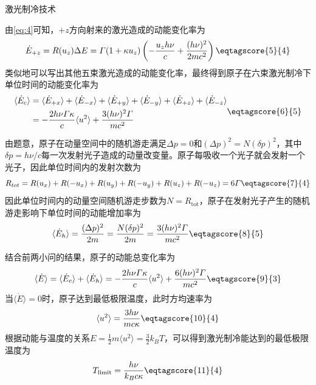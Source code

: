 \documentclass[answer]{cphos}
\begin{document}
\begin{problem}[40]{激光制冷技术}
\begin{solution}
由\ref{eq:4}可知，$+z$方向射来的激光造成的动能变化率为
\begin{equation}
    \dot{E}_{+z} = R(u_z) \Delta E = \varGamma(1+\kappa u_z) \left(-\frac{u_zh\nu}{c}+\frac{(h\nu)^2}{2mc^2}\right) \eqtagscore{5}{4}
\end{equation}
类似地可以写出其他五束激光造成的动能变化率，最终得到原子在六束激光制冷下单位时间的动能变化率为
\begin{equation}
    \begin{aligned}
    \langle \dot{E}_c \rangle &= \langle \dot{E}_{+x} \rangle + \langle \dot{E}_{-x} \rangle + \langle \dot{E}_{+y} \rangle + \langle \dot{E}_{-y} \rangle + \langle \dot{E}_{+z} \rangle + \langle \dot{E}_{-z} \rangle \\
    &= -\frac{2h\nu\varGamma\kappa}{c} \langle u^2 \rangle + \frac{3(h\nu)^2\varGamma}{mc^2}
    \end{aligned}
    \eqtagscore{6}{5}
\end{equation}

 由题意，原子在动量空间中的随机游走满足$\Delta p = 0$和$(\Delta p)^2 = N(\delta p)^2$，其中$\delta p = h\nu/c$每一次发射光子造成的动量改变量。原子每吸收一个光子就会发射一个光子，因此单位时间内的发射次数为
\begin{equation}
    R_{tot} = R(u_x) + R(-u_x) + R(u_y) + R(-u_y) + R(u_z) + R(-u_z) = 6\varGamma \eqtagscore{7}{4}
\end{equation}
因此单位时间内的动量空间随机游走步数为$N = R_\text{tot}$，原子在发射光子产生的随机游走影响下单位时间的动能增加率为
\begin{equation}
    \langle \dot{E}_h \rangle = \frac{(\Delta p)^2}{2m} = \frac{N(\delta p)^2}{2m} = \frac{3(h\nu)^2\varGamma}{mc^2} \eqtagscore{8}{5}
\end{equation}

 结合前两小问的结果，原子的动能总变化率为
\begin{equation}
    \langle \dot{E} \rangle = \langle \dot{E}_c \rangle + \langle \dot{E}_h \rangle = -\frac{2h\nu\varGamma\kappa}{c} \langle u^2 \rangle + \frac{6(h\nu)^2\varGamma}{mc^2} \eqtagscore{9}{3}
\end{equation}
当$\langle \dot{E} \rangle = 0$时，原子达到最低极限温度，此时方均速率为
\begin{equation}
    \langle u^2 \rangle = \frac{3h\nu}{mc\kappa} \eqtagscore{10}{4}
\end{equation}
根据动能与温度的关系$E = \frac{1}{2}m\langle u^2 \rangle = \frac{3}{2}k_B T$，可以得到激光制冷能达到的最低极限温度为
\begin{equation}
    T_{\text{limit}} = \frac{h\nu}{k_B c \kappa} \eqtagscore{11}{4}
\end{equation}

\scoring  %

\end{solution}

\end{problem}
\end{document}

